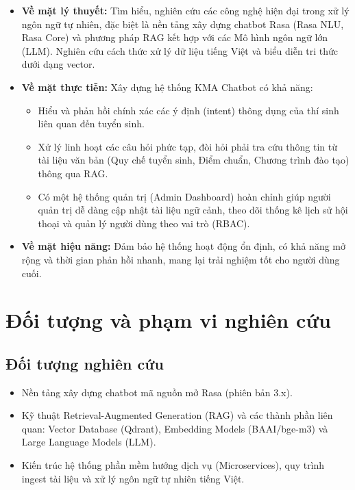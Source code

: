 \begin{itemize}
    \item \textbf{Về mặt lý thuyết:} Tìm hiểu, nghiên cứu các công nghệ hiện đại trong xử lý ngôn ngữ tự nhiên, đặc biệt là nền tảng xây dựng chatbot Rasa (Rasa NLU, Rasa Core) và phương pháp RAG kết hợp với các Mô hình ngôn ngữ lớn (LLM). Nghiên cứu cách thức xử lý dữ liệu tiếng Việt và biểu diễn tri thức dưới dạng vector.
    \item \textbf{Về mặt thực tiễn:} Xây dựng hệ thống KMA Chatbot có khả năng:
    \begin{itemize}
        \item Hiểu và phản hồi chính xác các ý định (intent) thông dụng của thí sinh liên quan đến tuyển sinh.
        \item Xử lý linh hoạt các câu hỏi phức tạp, đòi hỏi phải tra cứu thông tin từ tài liệu văn bản (Quy chế tuyển sinh, Điểm chuẩn, Chương trình đào tạo) thông qua RAG.
        \item Có một hệ thống quản trị (Admin Dashboard) hoàn chỉnh giúp người quản trị dễ dàng cập nhật tài liệu ngữ cảnh, theo dõi thống kê lịch sử hội thoại và quản lý người dùng theo vai trò (RBAC).
    \end{itemize}
    \item \textbf{Về mặt hiệu năng:} Đảm bảo hệ thống hoạt động ổn định, có khả năng mở rộng và thời gian phản hồi nhanh, mang lại trải nghiệm tốt cho người dùng cuối.
\end{itemize}

\section{Đối tượng và phạm vi nghiên cứu}
\subsection{Đối tượng nghiên cứu}
\begin{itemize}
    \item Nền tảng xây dựng chatbot mã nguồn mở Rasa (phiên bản 3.x).
    \item Kỹ thuật Retrieval-Augmented Generation (RAG) và các thành phần liên quan: Vector Database (Qdrant), Embedding Models (BAAI/bge-m3) và Large Language Models (LLM).
    \item Kiến trúc hệ thống phần mềm hướng dịch vụ (Microservices), quy trình ingest tài liệu và xử lý ngôn ngữ tự nhiên tiếng Việt.
\end{itemize}


